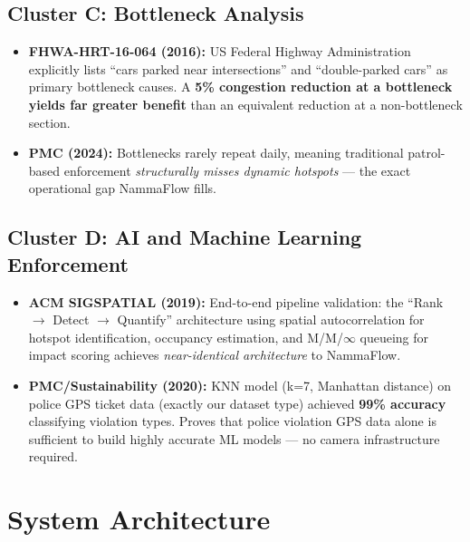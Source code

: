 \documentclass[12pt,a4paper]{article}
\begin{document}
\subsection{Cluster C: Bottleneck Analysis}

\begin{itemize}[leftmargin=1.5em]
    \item \textbf{FHWA-HRT-16-064 (2016):} US Federal Highway Administration explicitly lists ``cars parked near intersections'' and ``double-parked cars'' as primary bottleneck causes. A \textbf{5\% congestion reduction at a bottleneck yields far greater benefit} than an equivalent reduction at a non-bottleneck section.
    
    \item \textbf{PMC (2024):} Bottlenecks rarely repeat daily, meaning traditional patrol-based enforcement \textit{structurally misses dynamic hotspots} — the exact operational gap NammaFlow fills.
\end{itemize}

\subsection{Cluster D: AI and Machine Learning Enforcement}

\begin{itemize}[leftmargin=1.5em]
    \item \textbf{ACM SIGSPATIAL (2019):} End-to-end pipeline validation: the ``Rank $\to$ Detect $\to$ Quantify'' architecture using spatial autocorrelation for hotspot identification, occupancy estimation, and M/M/$\infty$ queueing for impact scoring achieves \textit{near-identical architecture} to NammaFlow.
    
    \item \textbf{PMC/Sustainability (2020):} KNN model (k=7, Manhattan distance) on police GPS ticket data (exactly our dataset type) achieved \textbf{99\% accuracy} classifying violation types. Proves that police violation GPS data alone is sufficient to build highly accurate ML models — no camera infrastructure required.
\end{itemize}

\section{System Architecture}
\end{document}
